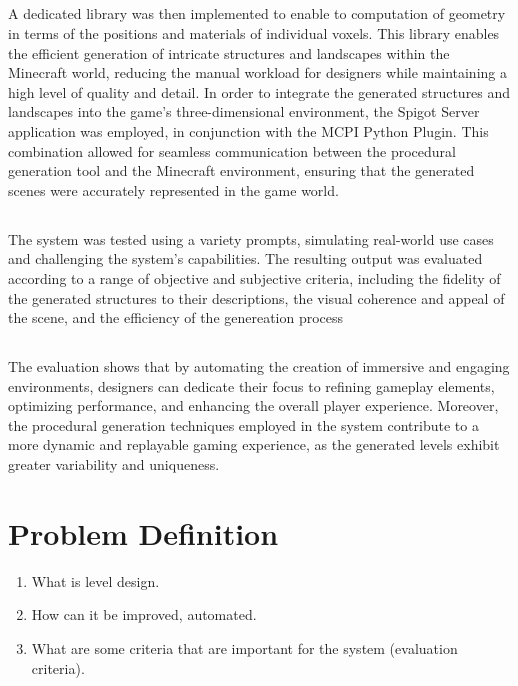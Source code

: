 \documentclass[11pt, a4paper]{article}
\begin{document}
\begin{flushleft}
    \subsection*{}
    A dedicated library was then implemented to enable to computation of geometry in terms of the positions and materials of individual voxels.
    This library enables the efficient generation of intricate structures and landscapes within the Minecraft world, reducing the manual workload for designers while maintaining a high level of quality and detail.
    In order to integrate the generated structures and landscapes into the game's three-dimensional environment, the Spigot Server application was employed, in conjunction with the MCPI Python Plugin. This combination allowed for seamless communication between the procedural generation tool and the Minecraft environment, ensuring that the generated scenes were accurately represented in the game world.


    \subsection*{}
    The system was tested using a variety prompts, simulating real-world use cases and challenging the system's capabilities. The resulting output was evaluated according to a range of objective and subjective criteria, including the fidelity of the generated structures to their descriptions, the visual coherence and appeal of the scene, and the efficiency of the genereation process

    \subsection*{}
    The evaluation shows that by automating the creation of immersive and engaging environments, designers can dedicate their focus to refining gameplay elements, optimizing performance, and enhancing the overall player experience. Moreover, the procedural generation techniques employed in the system contribute to a more dynamic and replayable gaming experience, as the generated levels exhibit greater variability and uniqueness.

    \pagebreak


\section*{Problem Definition}
\begin{enumerate}
    \item What is level design.
    \item How can it be improved, automated.
    \item What are some criteria that are important for the system (evaluation criteria).
\end{enumerate}


\end{flushleft}
\end{document}
